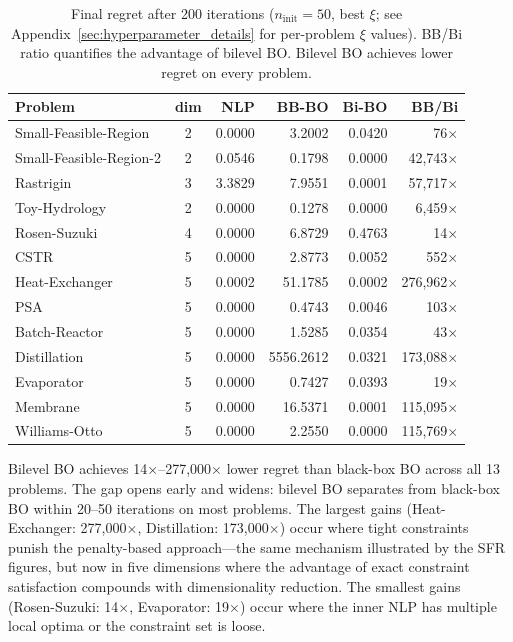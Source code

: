 \documentclass[12pt,a4paper]{article}%
\theoremstyle{plain}%
\theoremstyle{remark}%
\theoremstyle{definition}%
\begin{document}
\begin{table}[htbp]
\centering
\caption{Final regret after 200 iterations ($n_\text{init}=50$, best $\xi$; see Appendix~\ref{sec:hyperparameter_details} for per-problem $\xi$ values). BB/Bi ratio quantifies the advantage of bilevel BO. Bilevel BO achieves lower regret on every problem.}
\label{tab:final_regret}
\begin{tabular}{@{}lcrrrr@{}}
\toprule
\textbf{Problem} & \textbf{dim} & \textbf{NLP} & \textbf{BB-BO} & \textbf{Bi-BO} & \textbf{BB/Bi} \\
\midrule
Small-Feasible-Region   & 2 & 0.0000 & 3.2002    & 0.0420   & 76$\times$          \\
Small-Feasible-Region-2 & 2 & 0.0546 & 0.1798    & 0.0000   & 42{,}743$\times$    \\
Rastrigin               & 3 & 3.3829 & 7.9551    & 0.0001   & 57{,}717$\times$    \\
Toy-Hydrology           & 2 & 0.0000 & 0.1278    & 0.0000   & 6{,}459$\times$     \\
Rosen-Suzuki            & 4 & 0.0000 & 6.8729    & 0.4763   & 14$\times$          \\
\midrule
CSTR                    & 5 & 0.0000 & 2.8773    & 0.0052   & 552$\times$         \\
Heat-Exchanger          & 5 & 0.0002 & 51.1785   & 0.0002   & 276{,}962$\times$   \\
PSA                     & 5 & 0.0000 & 0.4743    & 0.0046   & 103$\times$         \\
Batch-Reactor           & 5 & 0.0000 & 1.5285    & 0.0354   & 43$\times$          \\
Distillation            & 5 & 0.0000 & 5556.2612 & 0.0321   & 173{,}088$\times$   \\
Evaporator              & 5 & 0.0000 & 0.7427    & 0.0393   & 19$\times$          \\
Membrane                & 5 & 0.0000 & 16.5371   & 0.0001   & 115{,}095$\times$   \\
Williams-Otto           & 5 & 0.0000 & 2.2550    & 0.0000   & 115{,}769$\times$   \\
\bottomrule
\end{tabular}
\end{table}

Bilevel BO achieves 14$\times$--277{,}000$\times$ lower regret than black-box BO across all 13 problems. The gap opens early and widens: bilevel BO separates from black-box BO within 20--50 iterations on most problems. The largest gains (Heat-Exchanger: 277{,}000$\times$, Distillation: 173{,}000$\times$) occur where tight constraints punish the penalty-based approach---the same mechanism illustrated by the SFR figures, but now in five dimensions where the advantage of exact constraint satisfaction compounds with dimensionality reduction. The smallest gains (Rosen-Suzuki: 14$\times$, Evaporator: 19$\times$) occur where the inner NLP has multiple local optima or the constraint set is loose.
\end{document}
